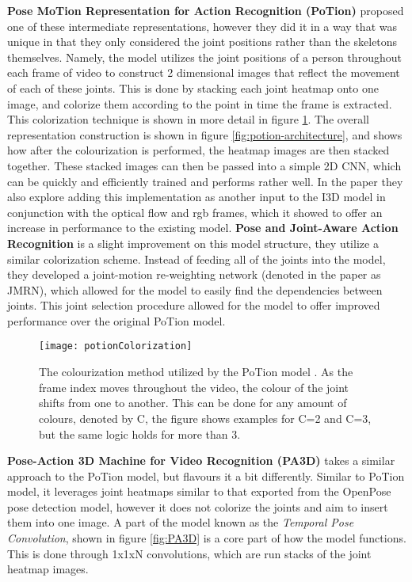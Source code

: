 \textbf{Pose MoTion Representation for Action Recognition (PoTion)} \cite{potion} proposed one of these intermediate representations, however they did it in a way that was unique in that they only considered the joint positions rather than the skeletons themselves. Namely, the model utilizes the joint positions of a person throughout each frame of video to construct 2 dimensional images that reflect the movement of each of these joints. This is done by stacking each joint heatmap onto one image, and colorize them according to the point in time the frame is extracted. This colorization technique is shown in more detail in figure \ref{fig:potion-colourization}. The overall representation construction is shown in figure \ref{fig:potion-architecture}, and shows how after the colourization is performed, the heatmap images are then stacked together. These stacked images can then be passed into a simple 2D CNN, which can be quickly and efficiently trained and performs rather well. In the paper they also explore adding this implementation as another input to the I3D \cite{i3d} model in conjunction with the optical flow and rgb frames, which it showed to offer an increase in performance to the existing model. \textbf{Pose and Joint-Aware Action Recognition} \cite{poseandjointaware} is a slight improvement on this model structure, they utilize a similar colorization scheme. Instead of feeding all of the joints into the model, they developed a joint-motion re-weighting network (denoted in the paper as JMRN), which allowed for the model to easily find the dependencies between joints. This joint selection procedure allowed for the model to offer improved performance over the original PoTion model.

\begin{figure}[ht]
	\texttt{[image: potionColorization]}
	\centering
	\caption{The colourization method utilized by the PoTion model \cite{potion}. As the frame index moves throughout the video, the colour of the joint shifts from one to another. This can be done for any amount of colours, denoted by C, the figure shows examples for C=2 and C=3, but the same logic holds for more than 3.}
	\label{fig:potion-colourization}
\end{figure}

\textbf{Pose-Action 3D Machine for Video Recognition (PA3D)} \cite{PA3D} takes a similar approach to the PoTion model, but flavours it a bit differently. Similar to PoTion model, it leverages joint heatmaps similar to that exported from the OpenPose pose detection model, however it does not colorize the joints and aim to insert them into one image. A part of the model known as the \textit{Temporal Pose Convolution}, shown in figure \ref{fig:PA3D} is a core part of how the model functions. This is done through 1x1xN convolutions, which are run stacks of the joint heatmap images.

